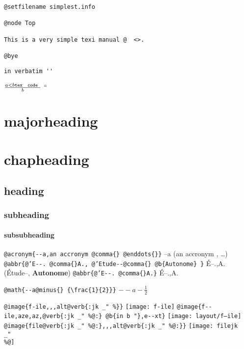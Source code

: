 \documentclass{book}
\newcommand{\GNUTexinfoplaceholder}[1]{}
\newcommand{\GNUTexinfonopagebreakheading}[2]{\let\clearpage\relax \let\cleardoublepage\relax \let\thispagestyle\GNUTexinfoplaceholder #1{#2}}
\renewcommand{\includegraphics}[1]{\fbox{FIG #1}}
\begin{document}
\begin{titlepage}
\begin{verbatim}
@setfilename simplest.info

@node Top

This is a very simple texi manual @  <>.

@bye
\end{verbatim}

\begin{verbatim}
in verbatim ''
\end{verbatim}





$\frac{a < b \texttt{tex \hbox{ code }}}{b}$ ``

\GNUTexinfonopagebreakheading{\chapter*}{majorheading}

\GNUTexinfonopagebreakheading{\chapter*}{chapheading}

\GNUTexinfonopagebreakheading{\section*}{heading}

\GNUTexinfonopagebreakheading{\subsection*}{subheading}

\GNUTexinfonopagebreakheading{\subsubsection*}{subsubheading}


\texttt{@acronym\{{-}{-}a,an accronym @comma\{\} @enddots\{\}\}} --a (an accronym , \dots{})
\texttt{@abbr\{@'E{-}{-}. @comma\{\}A., @'Etude{-}{-}@comma\{\} @b\{Autonome\} \}} \'{E}--.\@ ,A.\@ (\'{E}tude--, \textbf{Autonome})
\texttt{@abbr\{@'E{-}{-}. @comma\{\}A.\}} \'{E}--.\@ ,A.\@

\texttt{@math\{{-}{-}a@minus\{\} \{\textbackslash{}frac\{1\}\{2\}\}\}} $--a- {\frac{1}{2}}$

\texttt{@image\{f-ile,,,alt@verb\{:jk \_" \%\@\}\}} \texttt{[image: f-ile]}
\texttt{@image\{f{-}{-}ile,aze,az,@verb\{:jk \_" \%@:\} @b\{in b "\},e{-}{-}xt\}} \texttt{[image: layout/f--ile]}
\texttt{@image\{file@verb\{:jk \_" \%@:\},,,alt@verb\{:jk \_" \%@:\}\}} \texttt{[image: filejk \\\_" \\\%@]}





\end{titlepage}
\end{document}
